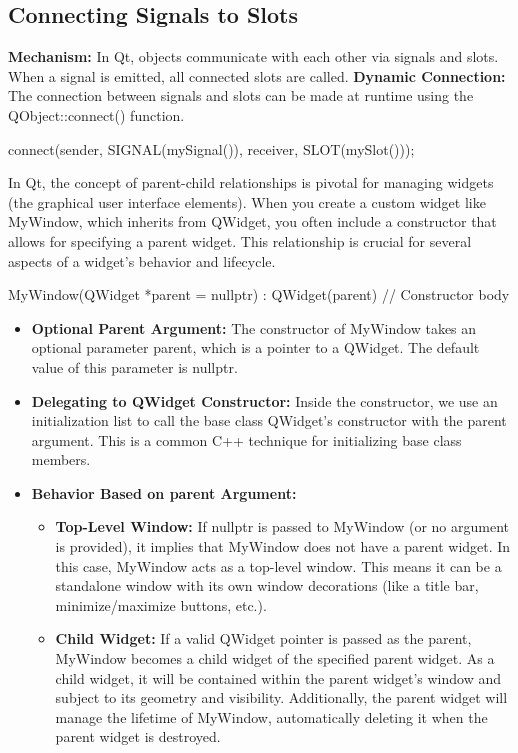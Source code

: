 \documentclass{report}
\begin{document}
    \pagebreak
    \subsection{Connecting Signals to Slots}
    \bigbreak \noindent 
    \textbf{Mechanism:} In Qt, objects communicate with each other via signals and slots. When a signal is emitted, all connected slots are called.
    \bigbreak \noindent 
    \textbf{Dynamic Connection:} The connection between signals and slots can be made at runtime using the QObject::connect() function.
    \bigbreak \noindent 
    \begin{cppcode}
    connect(sender, SIGNAL(mySignal()), receiver, SLOT(mySlot()));
    \end{cppcode}

    \bigbreak \noindent 
    \bigbreak \noindent
    In Qt, the concept of parent-child relationships is pivotal for managing widgets (the graphical user interface elements). When you create a custom widget like MyWindow, which inherits from QWidget, you often include a constructor that allows for specifying a parent widget. This relationship is crucial for several aspects of a widget's behavior and lifecycle.
    \bigbreak \noindent 
    \begin{cppcode}
MyWindow(QWidget *parent = nullptr) : QWidget(parent) {
    // Constructor body
}
    \end{cppcode}
    \bigbreak \noindent 
    \begin{itemize}
        \item \textbf{Optional Parent Argument:} The constructor of MyWindow takes an optional parameter parent, which is a pointer to a QWidget. The default value of this parameter is nullptr.
        \item \textbf{Delegating to QWidget Constructor:} Inside the constructor, we use an initialization list to call the base class QWidget's constructor with the parent argument. This is a common C++ technique for initializing base class members.
        \item \textbf{Behavior Based on parent Argument:}
        \begin{itemize}
            \item \textbf{Top-Level Window:} If nullptr is passed to MyWindow (or no argument is provided), it implies that MyWindow does not have a parent widget. In this case, MyWindow acts as a top-level window. This means it can be a standalone window with its own window decorations (like a title bar, minimize/maximize buttons, etc.).
            \item \textbf{Child Widget:} If a valid QWidget pointer is passed as the parent, MyWindow becomes a child widget of the specified parent widget. As a child widget, it will be contained within the parent widget's window and subject to its geometry and visibility. Additionally, the parent widget will manage the lifetime of MyWindow, automatically deleting it when the parent widget is destroyed.
        \end{itemize}
    \end{itemize}
\end{document}
